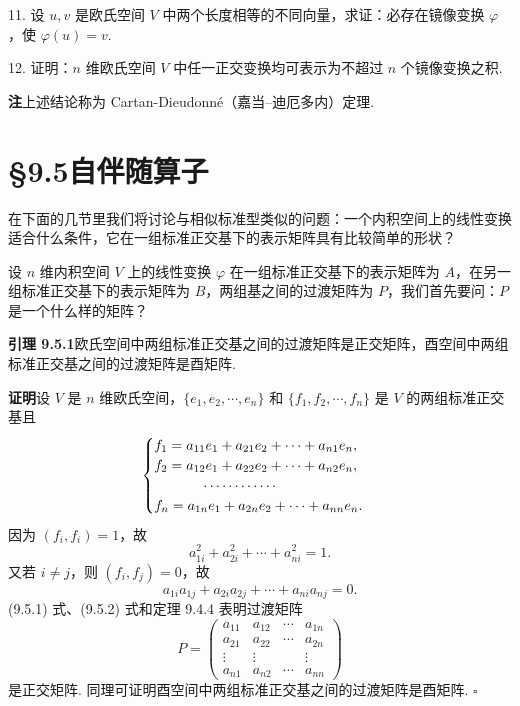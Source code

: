 \documentclass[UTF8,12pt,a4paper,fontset=fandol]{ctexart}
\begin{document}
11. 设 $u,v$ 是欧氏空间 $V$ 中两个长度相等的不同向量，求证：必存在镜像变换 $\varphi$，使 $\varphi(u)=v$.

12. 证明：$n$ 维欧氏空间 $V$ 中任一正交变换均可表示为不超过 $n$ 个镜像变换之积.

\noindent\textbf{注}\quad 上述结论称为 Cartan-Dieudonn\'e（嘉当--迪厄多内）定理.

\section*{§9.5\quad 自伴随算子}

在下面的几节里我们将讨论与相似标准型类似的问题：一个内积空间上的线性变换适合什么条件，它在一组标准正交基下的表示矩阵具有比较简单的形状？

设 $n$ 维内积空间 $V$ 上的线性变换 $\varphi$ 在一组标准正交基下的表示矩阵为 $A$，在另一组标准正交基下的表示矩阵为 $B$，两组基之间的过渡矩阵为 $P$，我们首先要问：$P$ 是一个什么样的矩阵？

\noindent\textbf{引理 9.5.1}\quad 欧氏空间中两组标准正交基之间的过渡矩阵是正交矩阵，酉空间中两组标准正交基之间的过渡矩阵是酉矩阵.

\noindent\textbf{证明}\quad 设 $V$ 是 $n$ 维欧氏空间，$\{e_1,e_2,\cdots,e_n\}$ 和 $\{f_1,f_2,\cdots,f_n\}$ 是 $V$ 的两组标准正交基且
\[
  \begin{cases}
    f_1=a_{11}e_1+a_{21}e_2+\cdots+a_{n1}e_n,\\
    f_2=a_{12}e_1+a_{22}e_2+\cdots+a_{n2}e_n,\\
    \hspace{3.5em}\cdots\cdots\cdots\cdots\\
    f_n=a_{1n}e_1+a_{2n}e_2+\cdots+a_{nn}e_n.
  \end{cases}
\]
因为 $(f_i,f_i)=1$，故
\begin{equation}
  a_{1i}^2+a_{2i}^2+\cdots+a_{ni}^2=1.
  \tag{9.5.1}
\end{equation}
又若 $i\ne j$，则 $(f_i,f_j)=0$，故
\begin{equation}
  a_{1i}a_{1j}+a_{2i}a_{2j}+\cdots+a_{ni}a_{nj}=0.
  \tag{9.5.2}
\end{equation}
(9.5.1) 式、(9.5.2) 式和定理 9.4.4 表明过渡矩阵
\[
  P=
  \left(\begin{array}{cccc}
    a_{11} & a_{12} & \cdots & a_{1n}\\
    a_{21} & a_{22} & \cdots & a_{2n}\\
    \vdots & \vdots & & \vdots\\
    a_{n1} & a_{n2} & \cdots & a_{nn}
  \end{array}\right)
\]
是正交矩阵. 同理可证明酉空间中两组标准正交基之间的过渡矩阵是酉矩阵. $\square$
\end{document}
